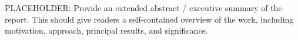 \documentclass{nrlreport} %
\begin{document}
\tableofcontents    %
\listoffigures      %
\listoftables       %

\begin{executivesummary}
PLACEHOLDER: Provide an extended abstract / executive summary of the report.
This should give readers a self-contained overview of the work, including
motivation, approach, principal results, and significance.
\end{executivesummary}


\end{document}
